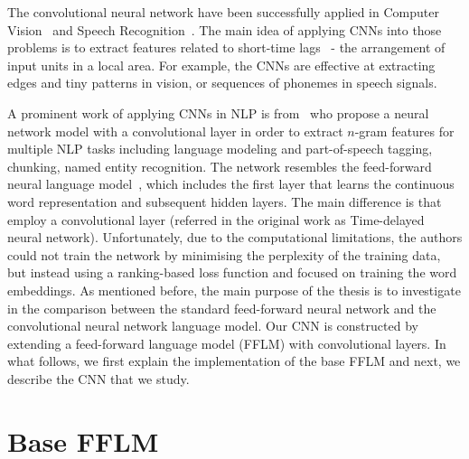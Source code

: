 The convolutional neural network have been successfully applied in Computer Vision~\cite{krizhevsky2012imagenet,kaiming2015resnet,szegedy2015going} and Speech Recognition~\cite{graves2005framewise,abdel2012applying}. The main idea of applying CNNs into those problems is to
extract features related to short-time lags~\cite{hochreiter1997long} - the arrangement of input units in a local area. For example, the CNNs are effective at extracting edges and tiny patterns in vision, or sequences of phonemes in speech signals.
%


A prominent work of applying CNNs in NLP is from~ who propose a neural network model with a convolutional layer in order to extract $n$-gram features for multiple NLP tasks including language modeling and part-of-speech tagging, chunking, named entity recognition. The network resembles the feed-forward neural language model~\cite{bengio2003neural},
which includes the first layer that learns the continuous word representation and subsequent hidden layers. The main difference is that~ employ a convolutional layer (referred in the original work as Time-delayed neural network). Unfortunately, due to the computational limitations, the authors could not train the network by minimising the perplexity of the training data, but instead using a ranking-based loss function and focused on training the word embeddings. 
%
As mentioned before, the main purpose of the thesis is to investigate in the comparison between the standard feed-forward neural network and the convolutional neural network language model. 
Our CNN is constructed by extending a feed-forward language model (FFLM) with convolutional layers. In what follows, we first explain the implementation of the base FFLM and next, we describe the CNN that we study.
%
%


\section{Base FFLM}




